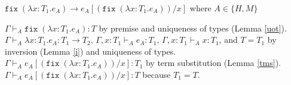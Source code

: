 \begin{case}
$\mathtt{fix}\;(\lambda x:T_{1}.e_{A})\rightarrow e_{A}[(\mathtt{fix}\;(\lambda x:T_{1}.e_{A}))/x]$ where $A\in\lbrace H,M\rbrace$

$\Gamma\vdash_{A}\mathtt{fix}\;(\lambda x:T_{1}.e_{A}):T$ by premise and uniqueness of types (Lemma \ref{uot}).  $\Gamma\vdash_{A}\lambda x:T_{1}.e_{A}:T_{1}\rightarrow T_{2}$, $\Gamma,x:T_{1}\vdash_{A}e_{A}:T_{1}$, $\Gamma,x:T_{1}\vdash_{A}x:T_{1}$, and $T=T_{1}$ by inversion (Lemma \ref{i}) and uniqueness of types.  $\Gamma\vdash_{A}e_{A}[(\mathtt{fix}\;(\lambda x:T_{1}.e_{A}))/x]:T_{1}$ by term substitution (Lemma \ref{tms}).  $\Gamma\vdash_{A}e_{A}[(\mathtt{fix}\;(\lambda x:T_{1}.e_{A}))/x]:T$ because $T_{1}=T$.
\end{case}